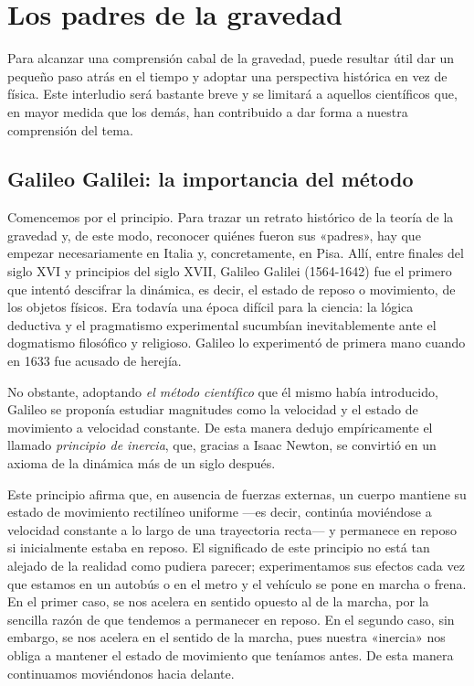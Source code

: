 
\chapter{Los padres de la gravedad}\label{ch:02}

Para alcanzar una comprensión cabal de la gravedad, puede resultar útil dar un pequeño
paso atrás en el tiempo y adoptar una perspectiva histórica en vez de física. Este
interludio será bastante breve y se limitará a aquellos científicos que, en mayor
medida que los demás, han contribuido a dar forma a nuestra comprensión del tema.

\section{Galileo Galilei: la importancia del método}\label{sec:02-galileo}

Comencemos por el principio. Para trazar un retrato histórico de la teoría de la gravedad
y, de este modo, reconocer quiénes fueron sus «padres», hay que empezar necesariamente
en Italia y, concretamente, en Pisa. Allí, entre finales del siglo XVI y principios
del siglo XVII, Galileo Galilei (1564-1642) fue el primero
que intentó descifrar la dinámica, es decir, el estado de reposo o movimiento, de los
objetos físicos. Era todavía una época difícil para la ciencia: la lógica deductiva
y el pragmatismo experimental sucumbían inevitablemente ante el dogmatismo filosófico
y religioso. Galileo lo experimentó de primera mano cuando en 1633 fue acusado
de herejía.

No obstante, adoptando \emph{el método científico} que él mismo había introducido,
Galileo
se proponía estudiar magnitudes como la velocidad y el estado de movimiento a velocidad
constante. De esta manera dedujo empíricamente el llamado \emph{principio de
inercia}, que, gracias a Isaac Newton,
se convirtió en un axioma de la dinámica más de un siglo después.

Este principio afirma que, en ausencia de fuerzas externas, un cuerpo mantiene su
estado de movimiento rectilíneo uniforme ---es decir, continúa moviéndose a velocidad
constante a lo largo de una trayectoria recta--- y permanece en reposo si inicialmente
estaba en reposo. El significado de este principio no está tan alejado de la realidad
como pudiera parecer; experimentamos sus efectos cada vez que estamos en un autobús
o en el metro y el vehículo se pone en marcha o frena. En el primer caso, se nos
acelera en sentido opuesto al de la marcha, por la sencilla razón de que tendemos a
permanecer en reposo. En el segundo caso, sin embargo, se nos acelera en el sentido
de la marcha, pues nuestra «inercia» nos obliga a mantener el estado de movimiento
que teníamos antes. De esta manera continuamos moviéndonos hacia delante.

